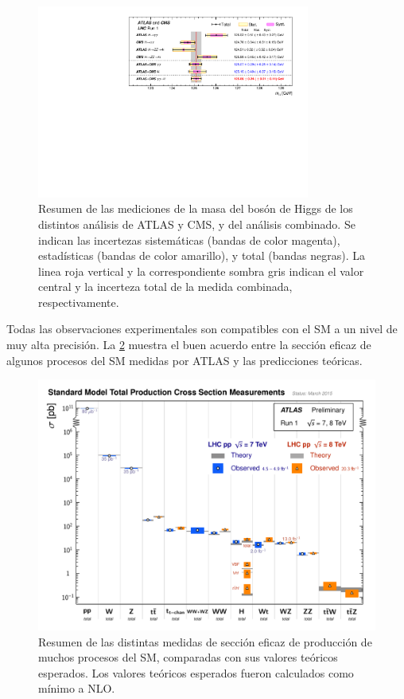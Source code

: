 \begin{figure}[!htbp]
  \centering \includegraphics[width=0.8\textwidth]{figures/higgs_atlas_cms_mass}
  \caption{Resumen de las mediciones de la masa del bosón de Higgs de los
    distintos análisis de ATLAS y CMS, y del análisis combinado. Se indican las
    incertezas sistemáticas (bandas de color magenta), estadísticas (bandas de
    color amarillo), y total (bandas negras). La linea roja vertical y la
    correspondiente sombra gris indican el valor central y la incerteza total de
    la medida combinada, respectivamente\cite{HiggsMass_ATLAS_CMS}.}
  \label{fig:higgs_cms_atlas}
\end{figure}

Todas las observaciones experimentales son compatibles con el SM a un nivel de
muy alta precisión. La \cref{fig:sm_atlas_xs} muestra el buen acuerdo entre la
sección eficaz de algunos procesos del SM medidas por ATLAS y las predicciones
teóricas.

\begin{figure}[!htbp]
  \centering
  \includegraphics[width=1\textwidth]{figures/ATLAS_a_SMSummary_TotalXsect.pdf}
  \caption{Resumen de las distintas medidas de sección eficaz de producción de muchos
    procesos del SM, comparadas con sus valores teóricos esperados.
    Los valores teóricos esperados fueron calculados como mínimo a NLO\cite{ATLASSM}.}
  \label{fig:sm_atlas_xs}
\end{figure}


